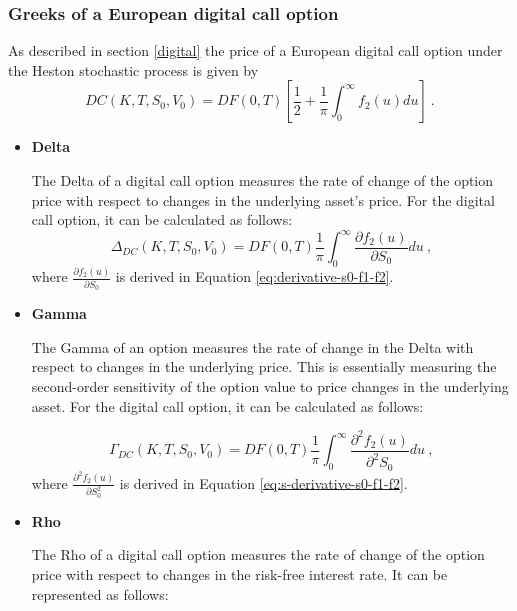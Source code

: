 



\subsubsection{Greeks of a European digital call option}
As described in section \ref{digital} the price of a European digital call option under the Heston stochastic process is given by
$$
DC(K,T, S_0, V_0) = DF(0,T)  \left[ \frac{1}{2} + \frac{1}{\pi}\int_0^{\infty}f_2(u) du \right]  \ .
$$


\begin{itemize}
\item \textbf{Delta} 

The Delta of a digital call option measures the rate of change of the option price with respect to changes in the underlying asset's price. For the digital call option, it can be calculated as follows:
$$
\Delta_{DC}(K,T,S_0,V_0) =  DF(0,T)    \frac{1}{\pi}\int_0^{\infty}  \frac{\partial f_2(u)}{\partial S_0}  du  \ , 
$$
where $\frac{\partial f_2(u)}{\partial S_0}$ is derived in Equation \ref{eq:derivative-s0-f1-f2}.


\item \textbf{Gamma} 

The Gamma of an option measures the rate of change in the Delta with respect to changes in the underlying price. This is essentially measuring the second-order sensitivity of the option value to price changes in the underlying asset. For the digital call option, it can be calculated as follows:

$$
\Gamma_{DC}(K,T,S_0,V_0) =  DF(0,T)    \frac{1}{\pi}\int_0^{\infty}  \frac{\partial^2 f_2(u)}{\partial^2 S_0}  du \ , 
$$
where $\frac{\partial^2 f_2(u)}{\partial S_0^2}$ is derived in Equation \ref{eq:s-derivative-s0-f1-f2}.


\item \textbf{Rho} 

The Rho of a digital call option measures the rate of change of the option price with respect to changes in the risk-free interest rate. It can be represented as follows:





\end{itemize}
